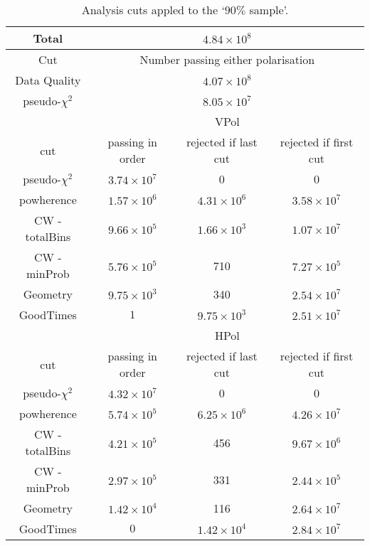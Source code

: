 \begin{table}
  \begin{center}
    \begin{tabular}{ c || c | c | c }
      Total & \multicolumn{3}{c}{ $4.84 \times 10^{8}$}\\
      \hline
      Cut & \multicolumn{3}{c}{ Number passing either polarisation}\\      
      \hline
      Data Quality & \multicolumn{3}{c}{$4.07 \times 10^8$}\\
      pseudo-$\chi^{2}$ & \multicolumn{3}{c}{$8.05 \times 10^7$}\\
      \hline\hline
      & \multicolumn{3}{c}{VPol}\\
      \hline
      cut & passing in order & rejected if last cut & rejected if first cut \\
      \hline
      pseudo-$\chi^{2}$ & $3.74 \times 10^7$ & 0 & 0\\
      powherence & $1.57 \times 10^6$ & $4.31 \times 10^6$ & $3.58 \times 10^7$\\
      CW - totalBins & $9.66 \times 10^5$ & $1.66 \times 10^3$ & $1.07 \times 10^7$\\
      CW - minProb & $5.76 \times 10^5$ & 710 & $7.27 \times 10^5$\\
      Geometry & $9.75 \times 10^3$ & 340 & $2.54 \times 10^7$\\
      GoodTimes & $1$ & $9.75 \times 10^3$ & $2.51 \times 10^7$\\
      \hline\hline
      & \multicolumn{3}{c}{HPol}\\
      \hline
      cut & passing in order & rejected if last cut & rejected if first cut \\
      \hline
      pseudo-$\chi^{2}$ & $4.32 \times 10^7$ & 0 & 0\\
      powherence & $5.74 \times 10^5$ & $6.25 \times 10^6$ & $4.26 \times 10^7$\\
      CW - totalBins & $4.21 \times 10^5$ & 456 & $9.67 \times 10^6$\\
      CW - minProb & $2.97 \times 10^5$ & 331 & $2.44 \times 10^5$\\
      Geometry & $1.42 \times 10^4$ & 116 & $2.64 \times 10^7$\\
      GoodTimes & $0$ & $1.42 \times 10^4$ & $2.84 \times 10^7$\\      
      \end{tabular} 
    \caption{Analysis cuts appled to the `$90 \%$ sample'.}
    \label{tab:Analysis:Cut-Flow}
  \end{center}
\end{table}

